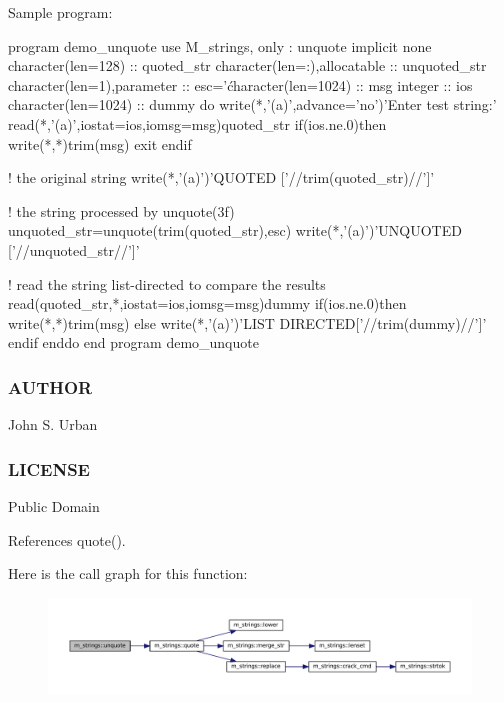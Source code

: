 Sample program\+: \begin{DoxyVerb}program demo_unquote
   use M_strings, only : unquote
   implicit none
   character(len=128)           :: quoted_str
   character(len=:),allocatable :: unquoted_str
   character(len=1),parameter   :: esc='\'
   character(len=1024)          :: msg
   integer                      :: ios
   character(len=1024)          :: dummy
   do
      write(*,'(a)',advance='no')'Enter test string:'
      read(*,'(a)',iostat=ios,iomsg=msg)quoted_str
      if(ios.ne.0)then
         write(*,*)trim(msg)
         exit
      endif

      ! the original string
      write(*,'(a)')'QUOTED       ['//trim(quoted_str)//']'

      ! the string processed by unquote(3f)
      unquoted_str=unquote(trim(quoted_str),esc)
      write(*,'(a)')'UNQUOTED     ['//unquoted_str//']'

      ! read the string list-directed to compare the results
      read(quoted_str,*,iostat=ios,iomsg=msg)dummy
      if(ios.ne.0)then
         write(*,*)trim(msg)
      else
         write(*,'(a)')'LIST DIRECTED['//trim(dummy)//']'
      endif
   enddo
end program demo_unquote
\end{DoxyVerb}


\subsubsection*{A\+U\+T\+H\+OR}

John S. Urban \subsubsection*{L\+I\+C\+E\+N\+SE}

Public Domain 

References quote().

Here is the call graph for this function\+:\nopagebreak
\begin{figure}[H]
\begin{center}
\leavevmode
\includegraphics[width=350pt]{namespacem__strings_acb88c65d5df2d5b3e55df2d2dab57390_cgraph}
\end{center}
\end{figure}
\mbox{\label{namespacem__strings_a0953ac5c4d31339fdd8ec3acc9c3c915}} 

